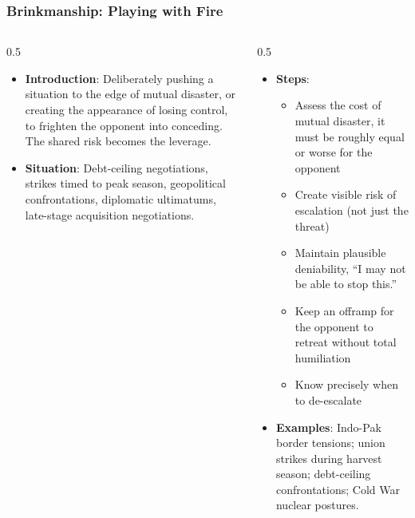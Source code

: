 \begin{frame}[fragile]\frametitle{Brinkmanship: Playing with Fire}
\begin{columns}
    \begin{column}[T]{0.5\linewidth}
      \begin{itemize}
        \item \textbf{Introduction}: Deliberately pushing a situation to the edge of mutual disaster, or creating the appearance of losing control, to frighten the opponent into conceding. The shared risk becomes the leverage.
        \item \textbf{Situation}: Debt-ceiling negotiations, strikes timed to peak season, geopolitical confrontations, diplomatic ultimatums, late-stage acquisition negotiations.
      \end{itemize}
    \end{column}
    \begin{column}[T]{0.5\linewidth}
      \begin{itemize}
        \item \textbf{Steps}:
        \begin{itemize}
          \item Assess the cost of mutual disaster, it must be roughly equal or worse for the opponent
          \item Create visible risk of escalation (not just the threat)
          \item Maintain plausible deniability, ``I may not be able to stop this.''
          \item Keep an offramp for the opponent to retreat without total humiliation
          \item Know precisely when to de-escalate
        \end{itemize}\item \textbf{Examples}: Indo-Pak border tensions; union strikes during harvest season; debt-ceiling confrontations; Cold War nuclear postures.
      \end{itemize}
    \end{column}
  \end{columns}
\end{frame}

